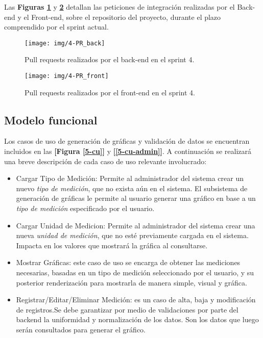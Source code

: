 Las \textbf{Figuras \ref{4-PR_back}} y \textbf{\ref{4-PR_front}} detallan las peticiones de integración realizadas por el Back-end y el Front-end, sobre el repositorio del proyecto, durante el plazo comprendido por el sprint actual.

\begin{figure}[h!]
  \centering
  \texttt{[image: img/4-PR\_back]}
  \caption{Pull requests realizados por el back-end en el sprint 4.}
  \label{4-PR_back}
\end{figure}
\begin{figure}[h!]
  \centering
  \texttt{[image: img/4-PR\_front]}
  \caption{Pull requests realizados por el front-end en el sprint 4.}
  \label{4-PR_front}
\end{figure}

	



\subsection{Modelo funcional} 


Los casos de uso de generación de gráficas y validación de datos se encuentran incluidos en las \textbf{[Figura \ref{5-cu}]} y \textbf{[\ref{5-cu-admin}]}. A continuación se realizará una breve descripción de cada caso de uso relevante involucrado:

\begin{itemize}
	\item Cargar Tipo de Medición: Permite al administrador del sistema crear un nuevo \textit{tipo de medición}, que no exista aún en el sistema. El subsistema de generación de gráficas le permite al usuario generar una gráfico en base a un \textit{tipo de medición} especificado por el usuario.
	
	\item Cargar Unidad de Medicion: Permite al administrador del sistema crear una nueva \textit{unidad de medición}, que no esté previamente cargada en el sistema. Impacta en los valores que mostrará la gráfica al consultarse.
	
	\item Mostrar Gráficas: este caso de uso se encarga de obtener las mediciones necesarias, basadas en un tipo de medición seleccionado por el usuario, y su posterior renderización para mostrarla de manera simple, visual y gráfica.
	
	\item Registrar/Editar/Eliminar Medición: es un caso de alta, baja y modificación de registros.Se debe garantizar por medio de validaciones por parte del backend la uniformidad y normalización de los datos.
	Son los datos que luego serán consultados para generar el gráfico.
	
\end{itemize}


